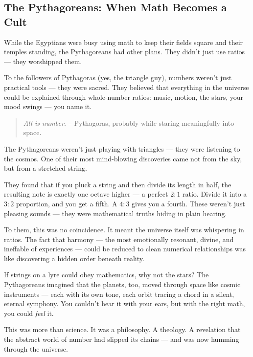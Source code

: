\subsection{The Pythagoreans: When Math Becomes a Cult}

While the Egyptians were busy using math to keep their fields square and their temples standing, the Pythagoreans had other plans. They didn’t just use ratios — they worshipped them.

To the followers of Pythagoras (yes, the triangle guy), numbers weren’t just practical tools — they were sacred. They believed that everything in the universe could be explained through whole-number ratios: music, motion, the stars, your mood swings — you name it.

\begin{quote}
    \textit{All is number.} – Pythagoras, probably while staring meaningfully into space.
\end{quote}

The Pythagoreans weren’t just playing with triangles — they were listening to the cosmos. One of their most mind-blowing discoveries came not from the sky, but from a stretched string.

They found that if you pluck a string and then divide its length in half, the resulting note is exactly one octave higher — a perfect \(2:1\) ratio. Divide it into a \(3:2\) proportion, and you get a fifth. A \(4:3\) gives you a fourth. These weren’t just pleasing sounds — they were mathematical truths hiding in plain hearing.

To them, this was no coincidence. It meant the universe itself was whispering in ratios. The fact that harmony — the most emotionally resonant, divine, and ineffable of experiences — could be reduced to clean numerical relationships was like discovering a hidden order beneath reality. 

If strings on a lyre could obey mathematics, why not the stars? The Pythagoreans imagined that the planets, too, moved through space like cosmic instruments — each with its own tone, each orbit tracing a chord in a silent, eternal symphony. You couldn't hear it with your ears, but with the right math, you could \textit{feel} it.

This was more than science. It was a philosophy. A theology. A revelation that the abstract world of number had slipped its chains — and was now humming through the universe.

\medskip

